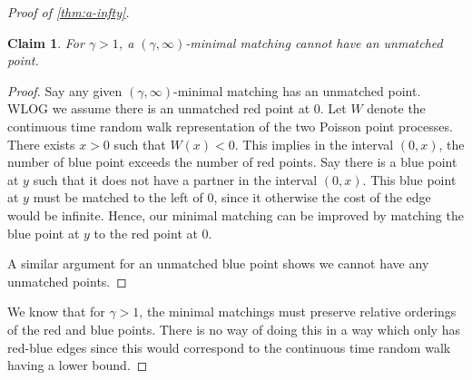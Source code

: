 \documentclass{article}
\newtheorem{claim}{Claim}
\begin{document}
\begin{proof}[Proof of \cref{thm:a-infty}]
  \begin{leftbar}
    \begin{claim}
     For $\gamma>1$, a $(\gamma,\infty)$-minimal
  matching cannot have an unmatched point.
\end{claim}
\begin{proof}
  Say any given $(\gamma,\infty)$-minimal matching has an unmatched point.
  WLOG we assume there is an unmatched red point at $0$. Let $W$
  denote the
  continuous time random walk representation of the two Poisson point
  processes. There exists $x>0$ such that $W(x)<0$. This implies in
  the interval $(0,x)$, the number of blue point exceeds the number of
  red points. Say there is a blue point at $y$ such that it does not
  have a partner in the interval $(0,x)$. This blue  point at $y$ must be matched to the left of $0$, since it
  otherwise the cost of the edge would be infinite. Hence, our minimal
  matching can be improved by matching the blue point at $y$ to the
  red point at $0$.


  A similar argument for an unmatched blue point shows we cannot have
  any unmatched points.
\end{proof}
  \end{leftbar}

  We know that for $\gamma>1$, the minimal matchings must preserve
  relative orderings of the red and blue points. There is no way of
  doing this in a way which only has red-blue edges since this would
  correspond to the continuous
  time random walk having a lower bound.
\end{proof}
\end{document}
